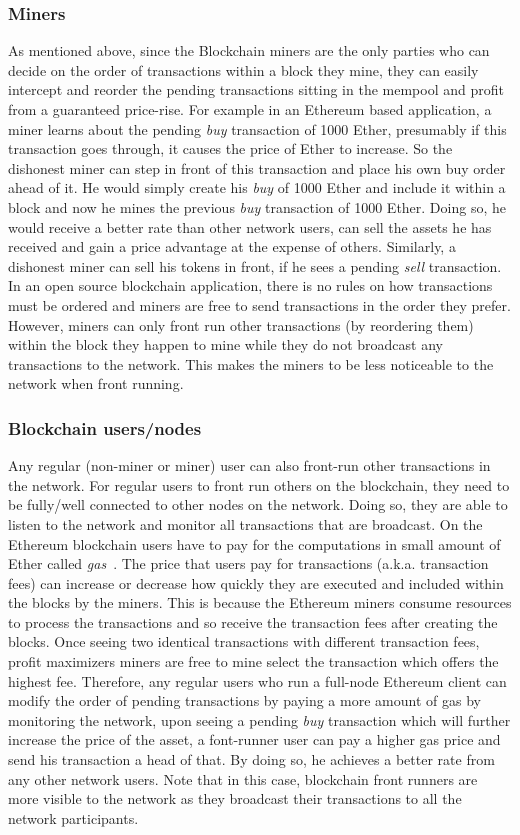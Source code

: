 \subsubsection{Miners}
As mentioned above, since the Blockchain miners are the only parties who can decide on the order of transactions within a block they mine, they can easily intercept and reorder the pending transactions sitting in the mempool and profit from a guaranteed price-rise. For example in an Ethereum based application, a miner learns about the pending \textit{buy} transaction of 1000 Ether, presumably if this transaction goes through, it causes the price of Ether to increase. So the dishonest miner can step in front of this transaction and  place his own buy order ahead of it. He would simply create his \textit{buy} of 1000 Ether and include it within a block and now he mines the previous \textit{buy} transaction of 1000 Ether. Doing so, he would receive a better rate than other network users, can sell the assets he has received and gain a price advantage at the expense of others. Similarly, a dishonest miner can sell his tokens in front, if he sees a pending \textit{sell} transaction. In an open source blockchain application, there is no rules on how transactions must be ordered and miners are free to send transactions in the order they prefer. However, miners can only front run other transactions (by reordering them) within the block they happen to mine while they do not broadcast any transactions to the network. This makes the miners to be less noticeable to the network when front running.

\subsubsection{Blockchain users/nodes}
Any regular (non-miner or miner) user can also front-run other transactions in the network. For regular users to front run others on the blockchain, they need to be fully/well connected to other nodes on the network. Doing so, they are able to listen to the network and monitor all transactions that are broadcast. On the Ethereum blockchain users have to pay for the computations in small amount of Ether called \textit{gas}~\cite{AccountT67:online}. The price that users pay for transactions (a.k.a. transaction fees) can increase or decrease how quickly they are executed and included within the blocks by the miners.  This is because the Ethereum miners consume resources to process the transactions and so receive the transaction fees after creating the blocks. Once seeing two identical transactions with different transaction fees, profit maximizers miners are free to mine select the transaction which offers the highest fee. Therefore, any regular users who run a full-node Ethereum client can modify the order of pending transactions by paying a more amount of gas \ie by monitoring the network, upon seeing a  pending \textit{buy} transaction which will further increase the price of the asset, a font-runner user can pay a higher gas price and send his transaction a head of that. By doing so, he achieves a better rate from any other network users. Note that in this case, blockchain front runners are more visible to the network as they broadcast their transactions to all the network participants. 


